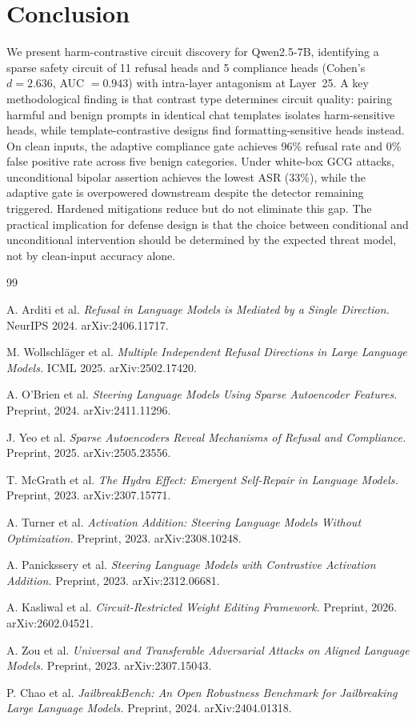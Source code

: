 \documentclass[11pt,a4paper]{article}
\begin{document}
\section{Conclusion}
We present harm-contrastive circuit discovery for Qwen2.5-7B, identifying a sparse safety circuit of 11 refusal heads and 5 compliance heads (Cohen's $d = 2.636$, AUC $= 0.943$) with intra-layer antagonism at Layer~25. A key methodological finding is that contrast type determines circuit quality: pairing harmful and benign prompts in identical chat templates isolates harm-sensitive heads, while template-contrastive designs find formatting-sensitive heads instead. On clean inputs, the adaptive compliance gate achieves 96\% refusal rate and 0\% false positive rate across five benign categories. Under white-box GCG attacks, unconditional bipolar assertion achieves the lowest ASR (33\%), while the adaptive gate is overpowered downstream despite the detector remaining triggered. Hardened mitigations reduce but do not eliminate this gap. The practical implication for defense design is that the choice between conditional and unconditional intervention should be determined by the expected threat model, not by clean-input accuracy alone.

\begin{thebibliography}{99}

A. Arditi et al. 
\textit{Refusal in Language Models is Mediated by a Single Direction.} 
NeurIPS 2024. arXiv:2406.11717.

M. Wollschläger et al. 
\textit{Multiple Independent Refusal Directions in Large Language Models.} 
ICML 2025. arXiv:2502.17420.

A. O'Brien et al. 
\textit{Steering Language Models Using Sparse Autoencoder Features.} 
Preprint, 2024. arXiv:2411.11296.

J. Yeo et al. 
\textit{Sparse Autoencoders Reveal Mechanisms of Refusal and Compliance.} 
Preprint, 2025. arXiv:2505.23556.

T. McGrath et al. 
\textit{The Hydra Effect: Emergent Self-Repair in Language Models.} 
Preprint, 2023. arXiv:2307.15771.

A. Turner et al. 
\textit{Activation Addition: Steering Language Models Without Optimization.} 
Preprint, 2023. arXiv:2308.10248.

A. Panickssery et al. 
\textit{Steering Language Models with Contrastive Activation Addition.} 
Preprint, 2023. arXiv:2312.06681.

A. Kasliwal et al. 
\textit{Circuit-Restricted Weight Editing Framework.} 
Preprint, 2026. arXiv:2602.04521.


A. Zou et al. 
\textit{Universal and Transferable Adversarial Attacks on Aligned Language Models.} 
Preprint, 2023. arXiv:2307.15043.

P. Chao et al. 
\textit{JailbreakBench: An Open Robustness Benchmark for Jailbreaking Large Language Models.} 
Preprint, 2024. arXiv:2404.01318.

\end{thebibliography}
\end{document}

